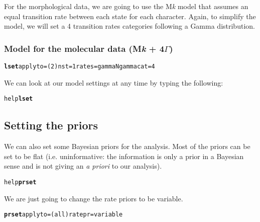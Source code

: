 \documentclass{article}\usepackage[]{graphicx}\usepackage[]{color}
\makeatletter
\newcommand{\hlstr}[1]{\textcolor[rgb]{0.192,0.494,0.8}{#1}}%
\newcommand{\hlkwd}[1]{\textcolor[rgb]{0.737,0.353,0.396}{\textbf{#1}}}%
\newenvironment{kframe}{%
 \def\at@end@of@kframe{}%
 \ifinner\ifhmode%
  \def\at@end@of@kframe{\end{minipage}}%
  \begin{minipage}{\columnwidth}%
 \fi\fi%
 \def\FrameCommand##1{\hskip\@totalleftmargin \hskip-\fboxsep
 \colorbox{shadecolor}{##1}\hskip-\fboxsep
     \hskip-\linewidth \hskip-\@totalleftmargin \hskip\columnwidth}%
 \MakeFramed {\advance\hsize-\width
   \@totalleftmargin\z@ \linewidth\hsize
   \@setminipage}}%
 {\par\unskip\endMakeFramed%
 \at@end@of@kframe}
\newenvironment{knitrout}{}{} %
\makeatother
\begin{document}
\noindent For the morphological data, we are going to use the M\textit{k} model that assumes an equal transition rate between each state for each character.
Again, to simplify the model, we will set a 4 transition rates categories following a Gamma distribution.

\subsubsection*{Model for the molecular data (M\textit{k} + 4$\Gamma$)}
\begin{knitrout}
\color{fgcolor}\begin{kframe}
\begin{alltt}
\hlkwd{lset} applyto=\hlstr{(2)} nst=\hlstr{1} rates=\hlstr{gamma} Ngammacat=\hlstr{4}
\end{alltt}
\end{kframe}
\end{knitrout}

\noindent We can look at our model settings at any time by typing the following:
\begin{knitrout}
\color{fgcolor}\begin{kframe}
\begin{alltt}
help \hlkwd{lset}
\end{alltt}
\end{kframe}
\end{knitrout}


\subsection{Setting the priors}
We can also set some Bayesian priors for the analysis.
Most of the priors can be set to be flat (i.e. uninformative: the information is only a prior in a Bayesian sense and is not giving an \textit{a priori} to our analysis).
\begin{knitrout}
\color{fgcolor}\begin{kframe}
\begin{alltt}
help \hlkwd{prset}
\end{alltt}
\end{kframe}
\end{knitrout}

\noindent We are just going to change the rate priors to be variable.
\begin{knitrout}
\color{fgcolor}\begin{kframe}
\begin{alltt}
\hlkwd{prset} applyto=\hlstr{(all)} ratepr=\hlstr{variable}
\end{alltt}
\end{kframe}
\end{knitrout}
\end{document}
